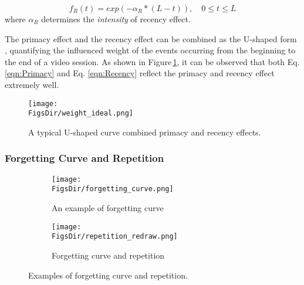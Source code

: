 \begin{equation} \label{eqn:Recency}
  f_{R}(t) = exp(-\alpha_{R}*(L - t)), \quad 0 \leq t \leq L
\end{equation}
where $\alpha_{R}$ determines the \textit{intensity} of recency effect.
    
The primacy effect and the recency effect can be combined as the U-shaped form \cite{PrimacyVsRecency}, quantifying the influenced weight of the events occurring from the beginning to the end of a video session. As shown in Figure\,\ref{fig:PrimacyRecencyShape}, it can be observed that both Eq. \ref{eqn:Primacy} and Eq. \ref{eqn:Recency} reflect the primacy and recency effect extremely well.
    
\begin{figure}[tb]
  \begin{center}
    \texttt{[image: \\FigsDir/weight\_ideal.png]}
  \end{center} 
  \caption{A typical U-shaped curve combined primacy and recency effects.}
  \label{fig:PrimacyRecencyShape}
\end{figure}


\subsubsection{Forgetting Curve and Repetition}\label{pro_for-rep}

\begin{figure}[tb]
  \centering
  \begin{subfigure}[b]{0.49\linewidth}
    \centering
    \texttt{[image: \\FigsDir/forgetting\_curve.png]}
    \caption{An example of forgetting curve}
    \label{fig:ForgettingCurve}
  \end{subfigure}
  \hfill
  \begin{subfigure}[b]{0.49\linewidth}
    \centering
    \texttt{[image: \\FigsDir/repetition\_redraw.png]}
    \caption{Forgetting curve and repetition}
    \label{fig:ForgettingCurveRepetition}
  \end{subfigure}
  
  \caption{Examples of forgetting curve and repetition.}
  \label{fig:ForgettingCurveRepetitionExamples}
\end{figure}

